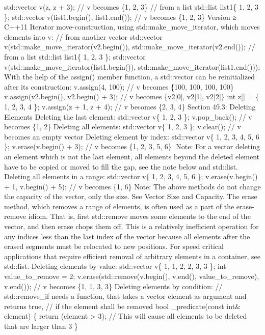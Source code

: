 std::vector v(z, z + 3); // v becomes \{1, 2, 3\} // from a list
std::list list1\{ 1, 2, 3 \}; std::vector v(list1.begin(), list1.end());
// v becomes \{1, 2, 3\} Version ≥ C++11 Iterator move-construction,
using std::make\_move\_iterator, which moves elements into v: // from
another vector std::vector v(std::make\_move\_iterator(v2.begin()),
std::make\_move\_iterator(v2.end()); // from a list std::list list1\{ 1,
2, 3 \}; std::vector v(std::make\_move\_iterator(list1.begin()),
std::make\_move\_iterator(list1.end())); With the help of the assign()
member function, a std::vector can be reinitialized after its
construction: v.assign(4, 100); // v becomes \{100, 100, 100, 100\}
v.assign(v2.begin(), v2.begin() + 3); // v becomes \{v2{[}0{]},
v2{[}1{]}, v2{[}2{]}\} int z{[}{]} = \{ 1, 2, 3, 4 \}; v.assign(z + 1, z
+ 4); // v becomes \{2, 3, 4\} Section 49.3: Deleting Elements Deleting
the last element: std::vector v\{ 1, 2, 3 \}; v.pop\_back(); // v
becomes \{1, 2\} Deleting all elements: std::vector v\{ 1, 2, 3 \};
v.clear(); // v becomes an empty vector Deleting element by index:
std::vector v\{ 1, 2, 3, 4, 5, 6 \}; v.erase(v.begin() + 3); // v
becomes \{1, 2, 3, 5, 6\} Note: For a vector deleting an element which
is not the last element, all elements beyond the deleted element have to
be copied or moved to ﬁll the gap, see the note below and std::list.
Deleting all elements in a range: std::vector v\{ 1, 2, 3, 4, 5, 6 \};
v.erase(v.begin() + 1, v.begin() + 5); // v becomes \{1, 6\} Note: The
above methods do not change the capacity of the vector, only the size.
See Vector Size and Capacity. The erase method, which removes a range of
elements, is often used as a part of the erase-remove idiom. That is,
ﬁrst std::remove moves some elements to the end of the vector, and then
erase chops them oﬀ. This is a relatively ineﬃcient operation for any
indices less than the last index of the vector because all elements
after the erased segments must be relocated to new positions. For speed
critical applications that require eﬃcient removal of arbitrary elements
in a container, see std::list. Deleting elements by value: std::vector
v\{ 1, 1, 2, 2, 3, 3 \}; int value\_to\_remove = 2;
v.erase(std::remove(v.begin(), v.end(), value\_to\_remove), v.end()); //
v becomes \{1, 1, 3, 3\} Deleting elements by condition: //
std::remove\_if needs a function, that takes a vector element as
argument and returns true, // if the element shall be removed bool
\_predicate(const int\& element) \{ return (element \textgreater{} 3);
// This will cause all elements to be deleted that are larger than 3 \}
